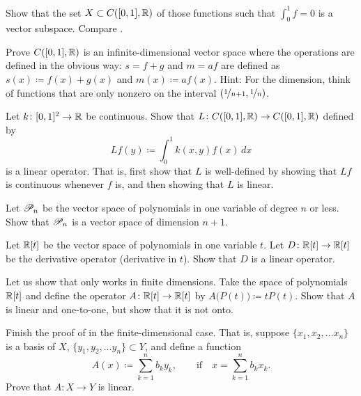 \begin{exercise} \label{exercise:intzerosubspace}
Show that the set $X \subset C([0,1],{\mathbb{R}})$ of those functions such 
that $\int_0^1 f = 0$ is a vector subspace.
Compare .
\end{exercise}

\begin{exercise}[Challenging]
Prove $C([0,1],{\mathbb{R}})$ is an infinite-dimensional vector space
where the operations are defined in the obvious way:
$s=f+g$ and $m=af$ are defined as
$s(x) \coloneqq f(x)+g(x)$ and
$m(x) \coloneqq a f(x)$.
Hint: For the dimension, think of functions that are only nonzero
on the interval $(\nicefrac{1}{n+1},\nicefrac{1}{n})$.
\end{exercise}

\begin{exercise} \label{exercise:continuouskernel}
Let $k \colon [0,1]^2 \to {\mathbb{R}}$ be continuous.  Show that
$L \colon C([0,1],{\mathbb{R}}) \to C([0,1],{\mathbb{R}})$ defined by
\begin{equation*}
Lf(y) \coloneqq \int_0^1 k(x,y)f(x)\,dx
\end{equation*}
is a linear operator.  That is, first show that $L$ is well-defined by
showing that $Lf$ is continuous whenever $f$ is, and
then showing that $L$ is linear.
\end{exercise}

\begin{exercise}
Let ${\mathscr{P}}_n$ be the vector space of polynomials in one variable of degree $n$
or less.  Show that ${\mathscr{P}}_n$ is a vector space of dimension $n+1$.
\end{exercise}

\begin{exercise}
Let ${\mathbb{R}}[t]$ be the vector space of polynomials in one variable $t$.  Let
$D \colon {\mathbb{R}}[t] \to {\mathbb{R}}[t]$ be the derivative operator (derivative in $t$).
Show that $D$ is a linear operator.
\end{exercise}

\begin{exercise}
Let us show that  only works in finite
dimensions.  Take the space of polynomials ${\mathbb{R}}[t]$ and define the operator $A \colon {\mathbb{R}}[t] \to {\mathbb{R}}[t]$
by $A\bigl(P(t)\bigr) \coloneqq tP(t)$.  Show that $A$ is linear and one-to-one, but
show that it is not onto.
\end{exercise}

\begin{exercise}
Finish the proof of  in the finite-dimensional case.
That is, suppose
$\{ x_1, x_2,\ldots x_n \}$ is a basis of $X$,
$\{ y_1, y_2,\ldots y_n \} \subset Y$, and define a
function
\begin{equation*}
A(x) \coloneqq \sum_{k=1}^n b_k y_k, \qquad \text{if} \quad x=\sum_{k=1}^n b_k x_k .
\end{equation*}
Prove that $A \colon X \to Y$ is linear.
\end{exercise}


